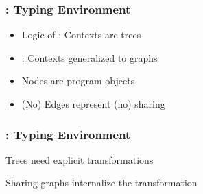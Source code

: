 \begin{frame}
  \frametitle{\qub{}: Typing Environment}
  \begin{center}
    \begin{itemize}
    \item Logic of \BI{}: Contexts are trees
    \item \qub{}: Contexts generalized to graphs
    \end{itemize}
    {\small
      \begin{minipage}[c]{0.45\linewidth}
      \centering
    \end{minipage}\hfill%
    \begin{minipage}[c]{0.45\linewidth}
      \centering
    \end{minipage}
  }
  \begin{itemize}
  \item Nodes are program objects
  \item (No) Edges represent (no) sharing
\end{itemize}
\end{center}
\end{frame}

\begin{frame}[fragile, c]
  \frametitle{\qub{}: Typing Environment}
  \begin{center}
  Trees need explicit transformations


  Sharing graphs internalize the transformation
\end{center}

\end{frame}

